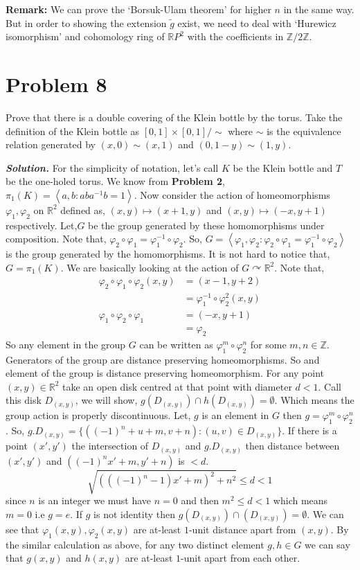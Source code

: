 \documentclass[11pt]{article}
\newcommand{\bb}[1]{\mathbb{#1}}
\newcommand{\Z}{\bb{Z}}
\newcommand{\R}{\mathbb{R}}
\newcommand{\inp}[2]{\left\langle {#1}, {#2} \right\rangle}
\newcommand{\sol}{ \textbf{\textit{Solution.}} }
\begin{document}
\noindent \textbf{\textsf{Remark:}} We can prove the `Borsuk-Ulam theorem' for higher $n$ in the same way. But in order to showing the extension $\tilde{g}$ exist, we need to deal with `Hurewicz isomorphism' and cohomology ring of $\R P^2$ with the coefficients in $\Z/2\Z$.


\section{Problem 8}

\begin{prob}{}{}
    Prove that there is a double covering of the Klein bottle by the torus. Take the definition of the Klein bottle as $[0,1] \times [0,1]/\sim$ where $\sim$ is the equivalence relation generated by $(x,0) \sim (x,1)$ and $(0,1-y) \sim (1,y)$.
\end{prob}

\sol For the simplicity of notation, let's call $K$ be the Klein bottle and $T$ be the one-holed torus. We know from \textbf{Problem 2}, $\pi_1(K) = \inp{a}{b : aba^{-1}b = 1}$. Now consider the action of homeomorphisms $\varphi_1,\varphi_2$ on $\R^2$ defined as, $(x,y)\mapsto (x+1,y)$ and $(x,y)\mapsto (-x,y+1)$ respectively. Let,$G$ be the group generated by these homomorphisms under composition. Note that, $\varphi_2\circ \varphi_1 = \varphi_1^{-1} \circ \varphi_2$. So, $G = \inp{\varphi_1}{\varphi_2 : \varphi_2\circ \varphi_1 = \varphi_1^{-1} \circ \varphi_2}$ is the group generated by the homomorphisms. It is not hard to notice that, $G = \pi_1(K)$. We are basically looking at the action of $G \curvearrowright \R^2$. Note that,
\begin{align*}
    \varphi_2 \circ \varphi_1 \circ \varphi_2 (x,y) &= (x-1,y+2)\\
    &= \varphi_1^{-1} \circ \varphi_2^2(x,y)\\
    \varphi_1 \circ \varphi_2 \circ \varphi_1 &= (-x,y+1) \\
    &= \varphi_2
\end{align*}
So any element in the group $G$ can be written as $\varphi_1^m \circ \varphi_2^n$ for some $m,n\in \mathbb{Z}$. Generators of the group are distance preserving homeomorphisms. So and element of the group is distance preserving homeomorphism. For any point $(x,y) \in \R^2$ take an open disk centred at that point with diameter $d< 1$. Call this disk $D_{(x,y)}$, we will show, $g(D_{(x,y)}) \cap h(D_{(x,y)}) = \emptyset$. Which means the group action is properly discontinuous. 
Let, $g$ is an element in $G$ then $g = \varphi_1^{m}\circ \varphi_2^{n}$. So, $g.D_{(x,y)} = \{((-1)^n +u+m,v+n) : (u,v) \in D_{(x,y)}\}$. If there is a point $(x',y')$ the intersection of $D_{(x,y)}$ and $g.D_{(x,y)}$ then distance between $(x',y')$ and $((-1)^nx'+m,y'+n)$ is $< d$. 
$$\sqrt{(((-1)^n-1)x'+m)^2+ n^2} \le d <1$$
since $n$ is an integer we must have $n =0$ and then $m^2 \le d<1$ which means $m=0$ i.e $g = e$. If $g$ is not identity then $g(D_{(x,y)}) \cap (D_{(x,y)}) = \emptyset$. We can see that $\varphi_1(x,y),\varphi_2(x,y)$ are at-least $1$-unit distance apart from $(x,y)$. By the similar calculation as above, for any two distinct element $g,h \in G$ we can say that $g(x,y)$ and $h(x,y)$ are at-least $1$-unit apart from each other.  
\end{document}
